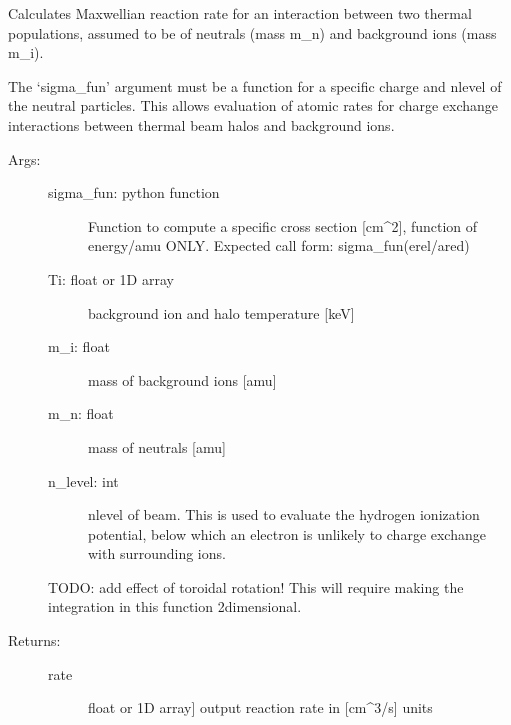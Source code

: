 \documentclass[letterpaper,10pt,english]{sphinxmanual}
\begin{document}
\begin{fulllineitems}
\label{\detokenize{aurora:aurora.nbi_neutrals.tt_rate_maxwell_average}}
Calculates Maxwellian reaction rate for an interaction between two thermal populations,
assumed to be of neutrals (mass m\_n) and background ions (mass m\_i).

The ‘sigma\_fun’ argument must be a function for a specific charge and n\sphinxhyphen{}level of the neutral 
particles. This allows evaluation of atomic rates for charge exchange interactions between thermal
beam halos and background ions.
\begin{description}
\item[{Args:}] \leavevmode\begin{description}
\item[{sigma\_fun: python function}] \leavevmode
Function to compute a specific cross section {[}cm\textasciicircum{}2{]}, function of energy/amu ONLY.
Expected call form: sigma\_fun(erel/ared)

\item[{Ti: float or 1D array}] \leavevmode
background ion and halo temperature {[}keV{]}

\item[{m\_i: float}] \leavevmode
mass of background ions {[}amu{]}

\item[{m\_n: float }] \leavevmode
mass of neutrals {[}amu{]}

\item[{n\_level: int}] \leavevmode
n\sphinxhyphen{}level of beam. This is used to evaluate the hydrogen ionization potential,
below which an electron is unlikely to charge exchange with surrounding ions.

\end{description}

TODO: add effect of toroidal rotation! This will require making the integration in this
function 2\sphinxhyphen{}dimensional.

\item[{Returns:}] \leavevmode\begin{description}
\item[{rate}] \leavevmode{[}float or 1D array{]}
output reaction rate in {[}cm\textasciicircum{}3/s{]} units

\end{description}

\end{description}

\end{fulllineitems}
\end{document}
